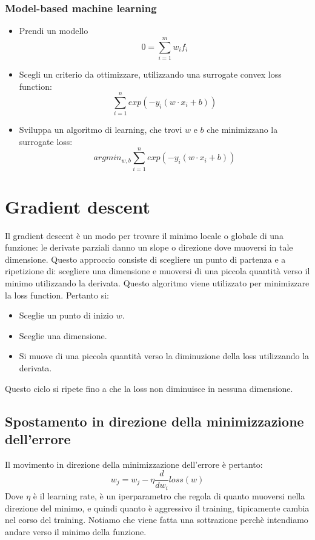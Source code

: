 	\subsubsection{Model-based machine learning}
	\begin{itemize}
		\item Prendi un modello 
		$$0=\sum\limits_{i=1}^m{w_i f_i}$$
		\item Scegli un criterio da ottimizzare, utilizzando una surrogate convex loss function:
		$$\sum\limits_{i=1}^n{exp(-y_i (w\cdot x_i+b))}$$
		\item Sviluppa un algoritmo di learning, che trovi $w$ e $b$ che minimizzano la surrogate loss: 
		$$argmin_{w,b}\sum\limits_{i=1}^n{exp(-y_i (w\cdot x_i+b))}$$
	\end{itemize}

\section{Gradient descent}
Il gradient descent \`e un modo per trovare il minimo locale o globale di una funzione: le derivate parziali danno un slope o direzione dove muoversi in tale dimensione.
Questo approccio consiste di scegliere un punto di partenza e a ripetizione di: scegliere una dimensione e muoversi di una piccola quantit\`a verso il minimo utilizzando la derivata. Questo algoritmo viene utilizzato per minimizzare la loss function.
Pertanto si:
\begin{itemize}
	\item Sceglie un punto di inizio $w$.
	\item Sceglie una dimensione.
	\item Si muove di una piccola quantit\`a verso la diminuzione della loss utilizzando la derivata.
\end{itemize}
Questo ciclo si ripete fino a che la loss non diminuisce in nessuna dimensione.

	\subsection{Spostamento in direzione della minimizzazione dell'errore}
	Il movimento in direzione della minimizzazione dell'errore \`e pertanto:
	$$w_j = w_j - \eta \dfrac{d}{dw_i}loss(w)$$
	Dove $\eta$ \`e il learning rate, \`e un iperparametro che regola di quanto muoversi nella direzione del minimo, e quindi quanto \`e aggressivo il training, tipicamente cambia nel corso del training. Notiamo che viene fatta una sottrazione perch\`e intendiamo andare verso il minimo della funzione.

